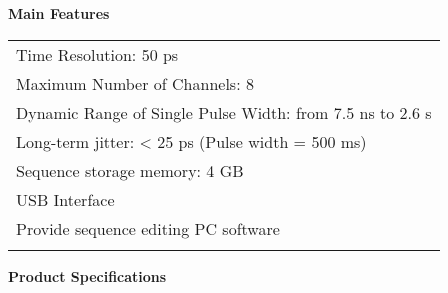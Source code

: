 \makeatletter
\def\hlinewd#1{%
  \noalign{\ifnum0=`}\fi\hrule \@height #1 \futurelet
   \reserved@a\@xhline}
\makeatother
\noindent\sanhao\textbf{Main Features}
\song
\begin{table}[H]
\normalsize
{}
\begin{tabular}{m{13.5cm}}
\rowcolor{gray!20}
\arrayrulecolor{tabcolor_top}\toprule[1.8pt]
Time Resolution: 50 ps\\\arrayrulecolor{tabcolor}\midrule[1.2pt]
Maximum Number of Channels: 8 \\\arrayrulecolor{tabcolor}\midrule[1.2pt]
Dynamic Range of  Single Pulse Width: from 7.5 ns  to  2.6 s\\\arrayrulecolor{tabcolor}\midrule[1.2pt]
Long-term jitter: < 25 ps (Pulse width = 500 ms) \\\arrayrulecolor{tabcolor}\midrule[1.2pt]
Sequence storage memory: 4 GB\\\arrayrulecolor{tabcolor}\midrule[1.2pt]
USB Interface\\\arrayrulecolor{tabcolor}\midrule[1.2pt]
Provide sequence editing PC software\\
\arrayrulecolor{tabcolor_top}\bottomrule[1.8pt]
\end{tabular}
\end{table}


\vspace{0.2cm}
\noindent\xiaosan\textbf{Product Specifications}
\vspace{0.5cm}

